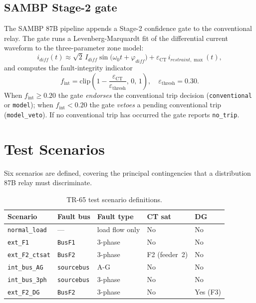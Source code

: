 \documentclass[12pt,a4paper]{article}
\newcommand{\fint}{f_{\mathrm{int}}}
\newcommand{\eCT}{\varepsilon_{\mathrm{CT}}}
\begin{document}
\subsection{SAMBP Stage-2 gate}
\label{sec:gate}

The SAMBP 87B pipeline appends a Stage-2 confidence gate to the conventional
relay.  The gate runs a Levenberg-Marquardt fit of the differential current
waveform to the three-parameter zone model:
\begin{equation}
  i_{diff}(t) \approx \sqrt{2}\,I_{diff}\sin\!\bigl(\omega_0 t + \varphi_{diff}\bigr)
                      + \eCT\, i_{restraint,\max}(t),
\end{equation}
and computes the fault-integrity indicator
\begin{equation}
  \fint = \mathrm{clip}\!\left(1 - \frac{\eCT}{\varepsilon_{\mathrm{thresh}}},\,0,\,1\right),
  \quad \varepsilon_{\mathrm{thresh}} = 0.30.
\end{equation}
When $\fint \geq 0.20$ the gate \emph{endorses} the conventional trip decision
(\texttt{conventional} or \texttt{model}); when $\fint < 0.20$ the gate
\emph{vetoes} a pending conventional trip (\texttt{model\_veto}).  If no
conventional trip has occurred the gate reports \texttt{no\_trip}.

\section{Test Scenarios}
\label{sec:scenarios}

Six scenarios are defined, covering the principal contingencies that a
distribution 87B relay must discriminate.

\begin{table}[H]
\centering
\caption{TR-65 test scenario definitions.}
\label{tab:scenarios}
\begin{tabular}{lllll}
\toprule
Scenario & Fault bus & Fault type & CT sat & DG \\
\midrule
\texttt{normal\_load}    & ---             & load flow only & No  & No \\
\texttt{ext\_F1}         & \texttt{BusF1}  & 3-phase        & No  & No \\
\texttt{ext\_F2\_ctsat}  & \texttt{BusF2}  & 3-phase        & F2 (feeder~2) & No \\
\texttt{int\_bus\_AG}    & \texttt{sourcebus} & A-G         & No  & No \\
\texttt{int\_bus\_3ph}   & \texttt{sourcebus} & 3-phase     & No  & No \\
\texttt{ext\_F2\_DG}     & \texttt{BusF2}  & 3-phase        & No  & Yes (F3) \\
\bottomrule
\end{tabular}
\end{table}
\end{document}
